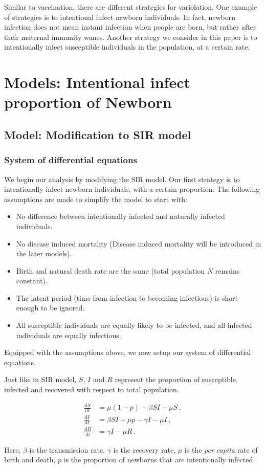 \documentclass[12pt]{article}
\newcommand\dbyd[2]{\frac{\mathrm d{#1}}{\mathrm d{#2}}}
\begin{document}
Similar to vaccination, there are different strategies for variolation. One example of strategies is to intentional infect newborn individuals. In fact, newborn infection does not mean instant infection when people are born, but rather after their maternal immunity wanes. Another strategy we consider in this paper is to intentionally infect susceptible individuals in the population, at a certain rate. 

\section{Models: Intentional infect proportion of Newborn}
\subsection{Model: Modification to SIR model}
\subsubsection{System of differential equations}
We begin our analysis by modifying the SIR model. Our first strategy is to intentionally infect newborn individuals, with a certain proportion.  The following assumptions are made to simplify the model to start with:
\begin{itemize}
\item No difference between intentionally infected and naturally infected individuals.
\item No disease induced mortality (Disease induced mortality will be introduced in the later models).
\item Birth and natural death rate are the same (total population $N$ remains constant).
\item The latent period (time from infection to becoming infectious) is short enough to be ignored.
\item All susceptible individuals are equally likely to be infected, and all infected individuals are equally infectious.
\end{itemize}
Equipped with the assumptions above, we now setup our system of differential equations.

Just like in SIR model, $S$, $I$ and $R$ represent the proportion of susceptible, infected and recovered with respect to total population.
\begin{linenomath*}
\begin{equation}\label{1}
\begin{split}
\dbyd{S}{t}&=\mu(1-p)- \beta SI-\mu S \,,\\
\dbyd{I}{t}&=\beta SI+\mu p-\gamma I -\mu I\,,\\
\dbyd{R}{t}&=\gamma I-\mu R\,.
\end{split}
\end{equation}
\end{linenomath*}
Here, $\beta$ is the transmission rate, $\gamma$ is the recovery rate,
$\mu$ is the \emph{per capita} rate of birth and death, $p$ is the
proportion of newborns that are intentionally infected.
\end{document}
